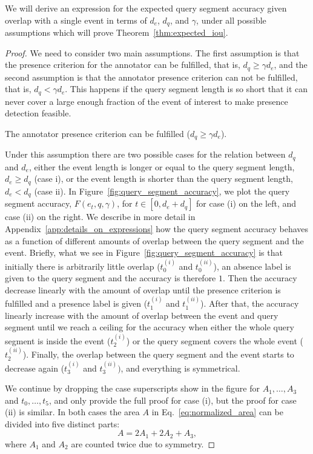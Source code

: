 \label{app:thm1}

We will derive an expression for the expected query segment accuracy given overlap with a single event in terms of $d_e$, $d_q$, and $\gamma$, under all possible assumptions which will prove Theorem~\ref{thm:expected_iou}. 

\begin{proof}
We need to consider two main assumptions. The first assumption is that the presence criterion for the annotator can be fulfilled, that is, $d_q \geq \gamma d_e$, and the second assumption is that the annotator presence criterion can not be fulfilled, that is, $d_q < \gamma d_e$. This happens if the query segment length is so short that it can never cover a large enough fraction of the event of interest to make presence detection feasible.

\begin{assumption}
    The annotator presence criterion can be fulfilled ($d_q \geq \gamma d_e$).
\end{assumption}
Under this assumption there are two possible cases for the relation between $d_q$ and $d_e$, either the event length is longer or equal to the query segment length, $d_e \geq d_q$ (case i), or the event length is shorter than the query segment length, $d_e < d_q$ (case ii). In Figure~\ref{fig:query_segment_accuracy}, we plot the query segment accuracy, $F(e_t, q, \gamma)$, for $t \in [0, d_e+d_q]$ for case (i) on the left, and case (ii) on the right. 
We describe in more detail in Appendix~\ref{app:details_on_expressions} how the query segment accuracy behaves as a function of different amounts of overlap between the query segment and the event. Briefly, what we see in Figure~\ref{fig:query_segment_accuracy} is that initially there is arbitrarily little overlap ($t_0^{(i)}$ and $t_0^{(ii)}$), an absence label is given to the query segment and the accuracy is therefore $1$. Then the accuracy decrease linearly with the amount of overlap until the presence criterion is fulfilled and a presence label is given ($t_1^{(i)}$ and $t_1^{(ii)}$). After that, the accuracy linearly increase with the amount of overlap between the event and query segment until we reach a ceiling for the accuracy when either the whole query segment is inside the event ($t_2^{(i)}$) or the query segment covers the whole event ($t_2^{(ii)}$). Finally, the overlap between the query segment and the event starts to decrease again ($t_3^{(i)}$ and $t_3^{(ii)})$, and everything is symmetrical.

We continue by dropping the case superscripts show in the figure for $A_1, \dots, A_3$ and $t_0, \dots, t_5$, and only provide the full proof for case (i), but the proof for case (ii) is similar. In both cases the area $A$ in Eq.~\ref{eq:normalized_area} can be divided into five distinct parts:
\begin{equation}
\label{eq:area}
    A = 2A_1 + 2A_2 + A_3,
\end{equation}
where $A_1$ and $A_2$ are counted twice due to symmetry.


\end{proof}

